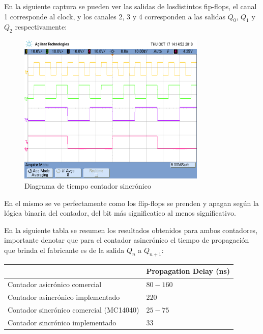 En la siguiente captura se pueden ver las salidas de losdistintos fip-flops, el canal 1 corresponde al clock, y los canales 2, 3 y 4 corresponden a las salidas $Q_0$, $Q_1$ y $Q_2$ respectivamente:

\begin{figure}[H]
	\centering
	\includegraphics[width=0.8\textwidth]{Ejercicio7/Recursos/senales_sincronico.png}
	\caption{Diagrama de tiempo contador sincr\'onico}
\end{figure}

En el mismo se ve perfectamente como los flip-flops se prenden y apagan seg\'un la l\'ogica binaria del contador, del bit m\'as significatico al menos significativo.

En la siguiente tabla se resumen los resultados obtenidos para ambos contadores, importante denotar que para el contador asincr\'onico el tiempo de propagaci\'on que brinda el fabricante es de la salida $Q_n$ a $Q_{n+1}$:

\begin{table}[H]
\centering
\begin{tabular}{ll}\hline
\multicolumn{1}{c}{}           & Propagation Delay (ns) \\ \hline
Contador asicr\'onico comercial     &            $80-160$  \\
Contador asincr\'onico implementado        &       $220$  \\
Contador sincr\'onico comercial (MC14040) &         $25-75$ \\
Contador sincr\'onico implementado   &       $33$        \\  \hline
\end{tabular}
\end{table}


